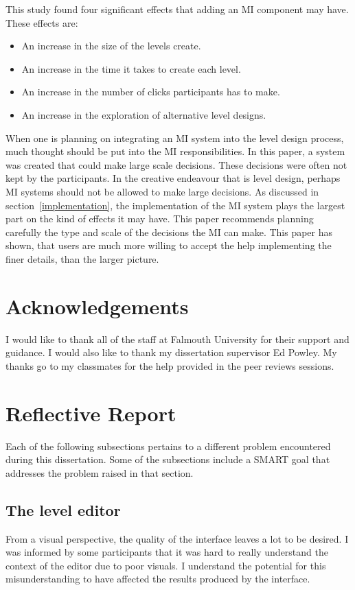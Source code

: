 \documentclass[journal]{IEEEtran}
\begin{document}
This study found four significant effects that adding an MI component may have. 
These effects are: 
\begin{itemize}
\item An increase in the size of the levels create.
\item An increase in the time it takes to create each level.
\item An increase in the number of clicks participants has to make.
\item An increase in the exploration of alternative level designs.
\end{itemize}

When one is planning on integrating an MI system into the level design process, much thought should be put into the MI responsibilities. In this paper, a system was created that could make large scale decisions. These decisions were often not kept by the participants. In the creative endeavour that is level design, perhaps MI systems should not be allowed to make large decisions. As discussed in section~\ref{implementation}, the implementation of the MI system plays the largest part on the kind of effects it may have. This paper recommends planning carefully the type and scale of the decisions the MI can make. This paper has shown, that users are much more willing to accept the help implementing the finer details, than the larger picture.




\appendices
\section{Acknowledgements}
I would like to thank all of the staff at Falmouth University for their support and guidance. I would also like to thank my dissertation supervisor Ed Powley. My thanks go to my classmates for the help provided in the peer reviews sessions.

\section{Reflective Report}
Each of the following subsections pertains to a different problem encountered during this dissertation. Some of the subsections include a SMART goal that addresses the problem raised in that section.

\subsection{The level editor}
From a visual perspective, the quality of the interface leaves a lot to be desired. I was informed by some participants that it was hard to really understand the context of the editor due to poor visuals. I understand the potential for this misunderstanding to have affected the results produced by the interface. 
\end{document}
